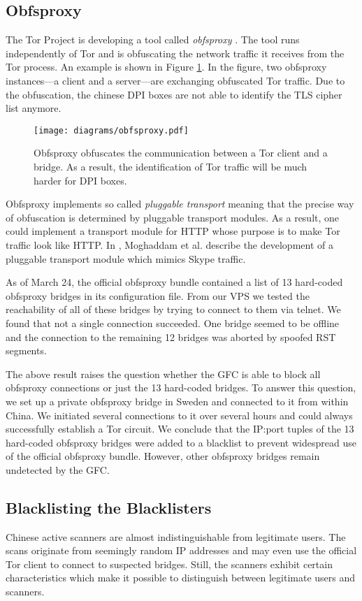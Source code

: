 \documentclass[runningheads,a4paper]{llncs}
\begin{document}
\subsection{Obfsproxy}
The Tor Project is developing a tool called \emph{obfsproxy} \cite{obfsproxy}. The tool runs
independently of Tor and is obfuscating the network traffic it receives from the Tor process. An
example is shown in Figure \ref{fig:obfsproxy}. In the figure, two obfsproxy instances---a client
and a server---are exchanging obfuscated Tor traffic. Due to the obfuscation, the chinese DPI boxes
are not able to identify the TLS cipher list anymore.

\begin{figure}
\centering
\texttt{[image: diagrams/obfsproxy.pdf]}
\caption{Obfsproxy obfuscates the communication between a Tor client and a bridge. As a result, the
identification of Tor traffic will be much harder for DPI boxes.}
\label{fig:obfsproxy}
\end{figure}

Obfsproxy implements so called \emph{pluggable transport} meaning that the precise way of
obfuscation is determined by pluggable transport modules. As a result, one could implement a
transport module for HTTP whose purpose is to make Tor traffic look like HTTP. In
\cite{Moghaddam2012}, Moghaddam et al. describe the development of a pluggable transport module
which mimics Skype traffic.

As of March 24, the official obfsproxy bundle \cite{obfsproxy} contained a list of 13 hard-coded
obfsproxy bridges in its configuration file. From our VPS we tested the reachability of all of these
bridges by trying to connect to them via telnet. We found that not a single connection succeeded.
One bridge seemed to be offline and the connection to the remaining 12 bridges was aborted by
spoofed RST segments.

The above result raises the question whether the GFC is able to block all obfsproxy connections or
just the 13 hard-coded bridges. To answer this question, we set up a private obfsproxy bridge in
Sweden and connected to it from within China. We initiated several connections to it over
several hours and could always successfully establish a Tor circuit. We conclude that the IP:port
tuples of the 13 hard-coded obfsproxy bridges were added to a blacklist to prevent widespread use of
the official obfsproxy bundle. However, other obfsproxy bridges remain undetected by the GFC.

\subsection{Blacklisting the Blacklisters}
Chinese active scanners are almost indistinguishable from legitimate users. The scans originate from
seemingly random IP addresses and may even use the official Tor client to connect to suspected
bridges. Still, the scanners exhibit certain characteristics which make it possible to distinguish
between legitimate users and scanners.
\end{document}
